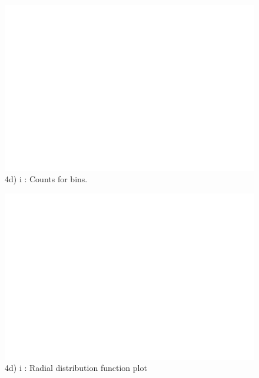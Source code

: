 \documentclass[a4paper,10pt,english]{article}
\begin{document}
\begin{figure}[h!]
        \centering 
        \includegraphics[scale=0.6]{./py/4di_rdf_bar.jpg} 
        \caption{4d) i : Counts for bins.  }
        \label{fig:4di_rdf_plot}
\end{figure}


\begin{figure}[h!]
        \centering 
        \includegraphics[scale=0.6]{./py/4di_rdf_plot.jpg} 
        \caption{4d) i : Radial distribution function plot }
        \label{fig:4di_rdf_plot}
\end{figure}
\end{document}
